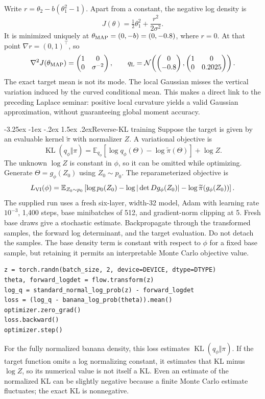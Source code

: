 \documentclass[11pt,a4paper]{article}
\makeatletter
\newcommand{\E}{\mathbb E}
\newcommand{\Normal}{\mathcal N}
\newcommand{\KL}{\operatorname{KL}}
\renewcommand\subsection{\@startsection{subsection}{2}{\z@}%
  {-3.25ex \@plus -1ex \@minus -.2ex}%
  {1.5ex \@plus .2ex}{\normalfont\large}}
\makeatother
\begin{document}
Write $r=\theta_2-b(\theta_1^2-1)$. Apart from a constant, the negative log density is
\[
 J(\theta)=\tfrac12\theta_1^2+\frac{r^2}{2\sigma^2}.
\]
It is minimized uniquely at $\theta_{\rm MAP}=(0,-b)=(0,-0.8)$, where $r=0$.
At that point $\nabla r=(0,1)^\top$, so
\[
 \nabla^2J(\theta_{\rm MAP})
 =\begin{pmatrix}1&0\\0&\sigma^{-2}\end{pmatrix},\qquad
 q_{\rm L}=\Normal\!\left(
 \begin{pmatrix}0\\-0.8\end{pmatrix},
 \begin{pmatrix}1&0\\0&0.2025\end{pmatrix}\right).
\]
The exact target mean is not its mode. The local Gaussian misses the vertical
variation induced by the curved conditional mean. This makes a direct link
to the preceding Laplace seminar: positive local curvature yields a valid
Gaussian approximation, without guaranteeing global moment accuracy.

\subsection{Reverse-KL training}
Suppose the target is given by an evaluable kernel $\widetilde\pi$ with
normalizer $Z$. A variational objective is
\[
 \KL(q_\phi\Vert\pi)
 =\E_{q_\phi}[\log q_\phi(\Theta)-\log\widetilde\pi(\Theta)]+\log Z.
\]
The unknown $\log Z$ is constant in $\phi$, so it can be omitted while
optimizing. Generate $\Theta=g_\phi(Z_0)$ using $Z_0\sim p_0$. The
reparameterized objective is
\[
 L_{\rm VI}(\phi)=\E_{Z_0\sim p_0}\left[
 \log p_0(Z_0)-\log|\det Dg_\phi(Z_0)|
 -\log\widetilde\pi(g_\phi(Z_0))\right].
\]
The supplied run uses a fresh six-layer, width-32 model, Adam with
learning rate $10^{-3}$, 1,400 steps, base minibatches of 512, and gradient-norm
clipping at 5. Fresh base draws give a stochastic estimate. Backpropagate through the
transformed samples, the forward log determinant, and the target evaluation.
Do not detach the samples. The base density term is constant with respect
to $\phi$ for a fixed base sample, but retaining it permits an interpretable
Monte Carlo objective value.

\begin{lstlisting}
z = torch.randn(batch_size, 2, device=DEVICE, dtype=DTYPE)
theta, forward_logdet = flow.transform(z)
log_q = standard_normal_log_prob(z) - forward_logdet
loss = (log_q - banana_log_prob(theta)).mean()
optimizer.zero_grad()
loss.backward()
optimizer.step()
\end{lstlisting}
For the fully normalized banana density, this loss estimates
$\KL(q_\phi\Vert\pi)$. If the target function omits a log normalizing
constant, it estimates that KL minus $\log Z$, so its numerical value is
not itself a KL. Even an estimate of the normalized KL can be slightly negative
because a finite Monte Carlo estimate fluctuates; the exact KL is nonnegative.
\end{document}
